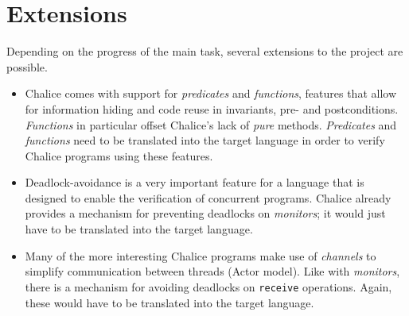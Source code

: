 \documentclass[11pt]{article} %
\begin{document}
\section{Extensions}
Depending on the progress of the main task, several extensions to the project are possible. 
\begin{itemize}
\item Chalice comes with support for \emph{predicates} and \emph{functions}, features that allow for information hiding and code reuse in invariants, pre- and postconditions. \emph{Functions} in particular offset Chalice's lack of \emph{pure} methods. \emph{Predicates} and \emph{functions} need to be translated into the target language in order to verify Chalice programs using these features.
\item Deadlock-avoidance is a very important feature for a language that is designed to enable the verification of concurrent programs. Chalice already provides a mechanism for preventing deadlocks on \emph{monitors}; it would just have to be translated into the target language.
\item Many of the more interesting Chalice programs make use of \emph{channels} to simplify communication between threads (Actor model). Like with \emph{monitors}, there is a mechanism for avoiding deadlocks on \texttt{receive} operations. Again, these would have to be translated into the target language.
\end{itemize}
\end{document}
